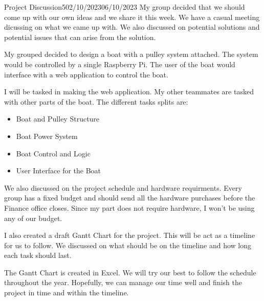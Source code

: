 \documentclass[12pt]{article}
\begin{document}
\begin{logbook-entry}{Project Discussion}{5}{02/10/2023}{06/10/2023}
My group decided that we should come up with our own ideas and we share it this week.    
We have a casual meeting dicussing on what we came up with.
We also discussed on potential solutions and potential issues that can arise from the solution.

My grouped decided to design a boat with a pulley system attached.
The system would be controlled by a single Raspberry Pi.
The user of the boat would interface with a web application to control the boat.

I will be tasked in making the web application.
My other teammates are tasked with other parts of the boat.
The different tasks splits are:
\begin{itemize}
    \item Boat and Pulley Structure
    \item Boat Power System
    \item Boat Control and Logic
    \item User Interface for the Boat
\end{itemize}

We also discussed on the project schedule and hardware requirments.
Every group has a fixed budget and should send all the hardware purchases before the Finance office closes.
Since my part does not require hardware, I won't be using any of our budget.

I also created a draft Gantt Chart for the project.
This will be act as a timeline for us to follow.
We discussed on what should be on the timeline and how long each task should last.

The Gantt Chart is created in Excel.
We will try our best to follow the schedule throughout the year.
Hopefully, we can manage our time well and finish the project in time and within the timeline.
\end{logbook-entry}
\end{document}
